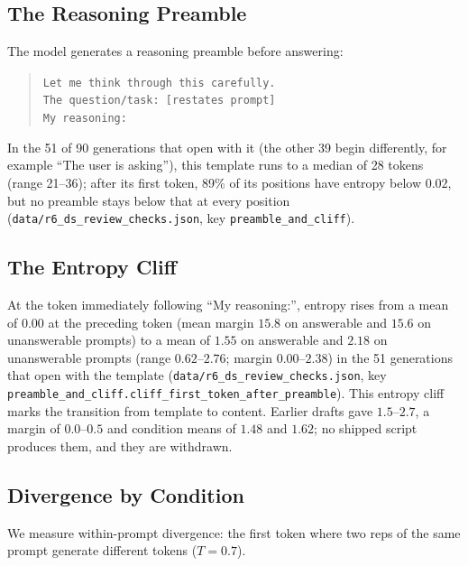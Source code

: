 \documentclass[11pt,a4paper]{article}
\begin{document}
\subsection{The Reasoning Preamble}

The model generates a reasoning preamble before answering:

\begin{quote}
\texttt{Let me think through this carefully.}\\
\texttt{The question/task: [restates prompt]}\\
\texttt{My reasoning:}
\end{quote}

In the 51 of 90 generations that open with it (the other 39 begin
differently, for example ``The user is asking''), this template runs to a
median of 28 tokens (range 21--36); after its first token, 89\% of its
positions have entropy below $0.02$, but no preamble stays below that at
every position (\texttt{data/\allowbreak r6\_\allowbreak ds\_\allowbreak review\_\allowbreak checks.json}, key
\texttt{preamble\_and\_cliff}).

\subsection{The Entropy Cliff}

At the token immediately following ``My reasoning:'', entropy rises
from a mean of $0.00$ at the preceding token (mean margin $15.8$ on
answerable and $15.6$ on unanswerable prompts) to a mean of $1.55$ on
answerable and $2.18$ on unanswerable prompts (range $0.62$--$2.76$;
margin $0.00$--$2.38$) in the 51 generations that open with the template
(\texttt{data/\allowbreak r6\_\allowbreak ds\_\allowbreak review\_\allowbreak checks.json}, key
\texttt{preamble\_\allowbreak and\_\allowbreak cliff.\allowbreak cliff\_\allowbreak first\_\allowbreak token\_\allowbreak after\_\allowbreak preamble}).
This entropy cliff marks the transition from template to content. Earlier
drafts gave $1.5$--$2.7$, a margin of $0.0$--$0.5$ and condition means of
$1.48$ and $1.62$; no shipped script produces them, and they are
withdrawn.

\subsection{Divergence by Condition}

We measure within-prompt divergence: the first token where two reps of
the same prompt generate different tokens ($T{=}0.7$).
\end{document}
